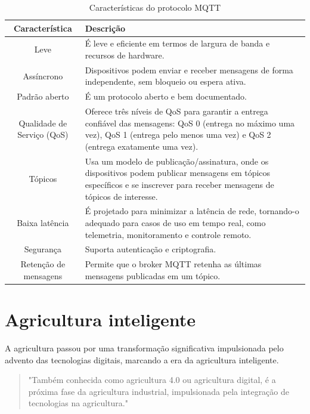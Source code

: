 \begin{table}[!htb]
  \caption{Características do protocolo MQTT} \label{tab:caract_mqtt}
  \begin{tabularx}{\textwidth}{|c|X|} \hline
    \textbf{Característica} & \textbf{Descrição} \\ \hline
    Leve & É leve e eficiente em termos de largura de banda e recursos de hardware. \\ \hline
    Assíncrono & Dispositivos podem enviar e receber mensagens de forma independente, sem bloqueio ou espera ativa. \\ \hline
    Padrão aberto & É um protocolo aberto e bem documentado. \\ \hline
    Qualidade de Serviço (QoS) & Oferece três níveis de QoS para garantir a entrega confiável das mensagens: QoS 0 (entrega no máximo uma vez), QoS 1 (entrega pelo menos uma vez) e QoS 2 (entrega exatamente uma vez). \\ \hline
    Tópicos & Usa um modelo de publicação/assinatura, onde os dispositivos podem publicar mensagens em tópicos específicos e se inscrever para receber mensagens de tópicos de interesse. \\ \hline  
    Baixa latência &  É projetado para minimizar a latência de rede, tornando-o adequado para casos de uso em tempo real, como telemetria, monitoramento e controle remoto. \\ \hline
    Segurança & Suporta autenticação e criptografia. \\ \hline
    Retenção de mensagens & Permite que o broker MQTT retenha as últimas mensagens publicadas em um tópico. \\ \hline  
  \end{tabularx}
\end{table}

\section{Agricultura inteligente}
A agricultura passou por uma transformação significativa impulsionada pelo advento das tecnologias digitais, marcando a era da agricultura inteligente. 

\begin{quote}
  "Também conhecida como agricultura 4.0 ou agricultura digital, é a próxima fase da agricultura industrial, impulsionada pela integração de tecnologias na agricultura." \parencite[{p. 424}]{Gurjeet_smart2022}
\end{quote}

